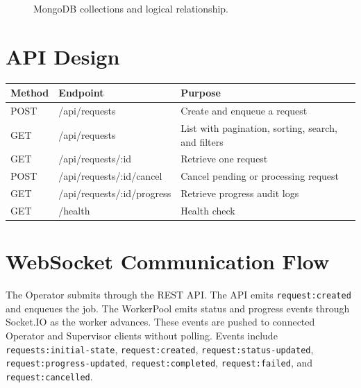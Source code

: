\documentclass[11pt,a4paper]{article}
\begin{document}
\begin{figure}[H]
\centering
{}
\caption{MongoDB collections and logical relationship.}
\end{figure}

\section{API Design}
\begin{longtable}{p{}p{}p{}}
\toprule Method & Endpoint & Purpose\\\midrule
POST & /api/requests & Create and enqueue a request\\
GET & /api/requests & List with pagination, sorting, search, and filters\\
GET & /api/requests/:id & Retrieve one request\\
POST & /api/requests/:id/cancel & Cancel pending or processing request\\
GET & /api/requests/:id/progress & Retrieve progress audit logs\\
GET & /health & Health check\\
\bottomrule
\end{longtable}

\section{WebSocket Communication Flow}
The Operator submits through the REST API. The API emits \texttt{request:created} and enqueues the job. The WorkerPool emits status and progress events through Socket.IO as the worker advances. These events are pushed to connected Operator and Supervisor clients without polling. Events include \texttt{requests:initial-state}, \texttt{request:created}, \texttt{request:status-updated}, \texttt{request:progress-updated}, \texttt{request:completed}, \texttt{request:failed}, and \texttt{request:cancelled}.
\end{document}
